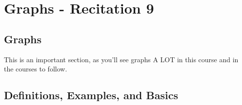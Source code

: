 \section{Graphs  - Recitation 9} 

\usetikzlibrary{positioning, arrows}

{}

\def\LinkedList#1{%
  \foreach \element in \list {
     \node[node of list, right = of aux, name=ele] {\element};
     \draw[link] (aux) -- (ele);
     \coordinate (aux) at (ele.east);
  } 
}








\subsection{Graphs}
This is an important section, as you'll see graphs A LOT in this course and in the courses to follow. 

\subsection{Definitions, Examples, and Basics}

